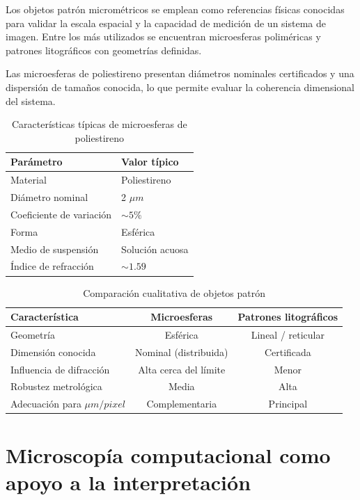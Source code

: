 Los objetos patrón micrométricos se emplean como referencias físicas conocidas para validar la escala espacial y la capacidad de medición de un sistema de imagen. Entre los más utilizados se encuentran microesferas poliméricas y patrones litográficos con geometrías definidas.

Las microesferas de poliestireno presentan diámetros nominales certificados y una dispersión de tamaños conocida, lo que permite evaluar la coherencia dimensional del sistema.

\begin{table}[H]
\centering
\caption{Características típicas de microesferas de poliestireno}
\begin{tabular}{|l|l|}
\hline
\textbf{Parámetro} & \textbf{Valor típico} \\
\hline
Material & Poliestireno \\
Diámetro nominal & 2 $\mu m$ \\
Coeficiente de variación & $\sim 5\%$ \\
Forma & Esférica \\
Medio de suspensión & Solución acuosa \\
Índice de refracción & $\sim 1.59$ \\
\hline
\end{tabular}
\end{table}

\begin{table}[H]
\centering
\caption{Comparación cualitativa de objetos patrón}
\begin{tabular}{|l|c|c|}
\hline
\textbf{Característica} & \textbf{Microesferas} & \textbf{Patrones litográficos} \\
\hline
Geometría & Esférica & Lineal / reticular \\
Dimensión conocida & Nominal (distribuida) & Certificada \\
Influencia de difracción & Alta cerca del límite & Menor \\
Robustez metrológica & Media & Alta \\
Adecuación para $\mu m/pixel$ & Complementaria & Principal \\
\hline
\end{tabular}
\end{table}

\section{Microscopía computacional como apoyo a la interpretación}

